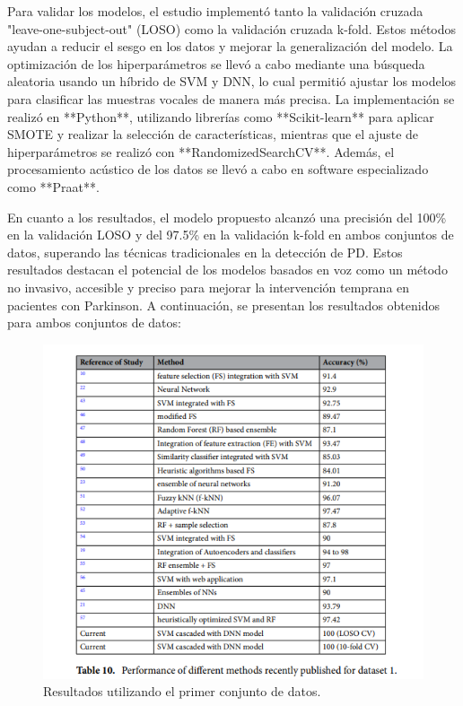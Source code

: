\documentclass[listof=nochaptergap,12pt,times,authoryear]{report}
\begin{document}
Para validar los modelos, el estudio implementó tanto la validación cruzada "leave-one-subject-out" (LOSO) como la validación cruzada k-fold. Estos métodos ayudan a reducir el sesgo en los datos y mejorar la generalización del modelo. La optimización de los hiperparámetros se llevó a cabo mediante una búsqueda aleatoria usando un híbrido de SVM y DNN, lo cual permitió ajustar los modelos para clasificar las muestras vocales de manera más precisa. La implementación se realizó en **Python**, utilizando librerías como **Scikit-learn** para aplicar SMOTE y realizar la selección de características, mientras que el ajuste de hiperparámetros se realizó con **RandomizedSearchCV**. Además, el procesamiento acústico de los datos se llevó a cabo en software especializado como **Praat**.

En cuanto a los resultados, el modelo propuesto alcanzó una precisión del 100\% en la validación LOSO y del 97.5\% en la validación k-fold en ambos conjuntos de datos, superando las técnicas tradicionales en la detección de PD. Estos resultados destacan el potencial de los modelos basados en voz como un método no invasivo, accesible y preciso para mejorar la intervención temprana en pacientes con Parkinson. A continuación, se presentan los resultados obtenidos para ambos conjuntos de datos:

\begin{figure}[H]
    \centering
    \includegraphics[width=\textwidth]{A1 - b1 .png}
    \caption{Resultados utilizando el primer conjunto de datos.}

    \label{fig:resultados_loso}
\end{figure}
\end{document}
